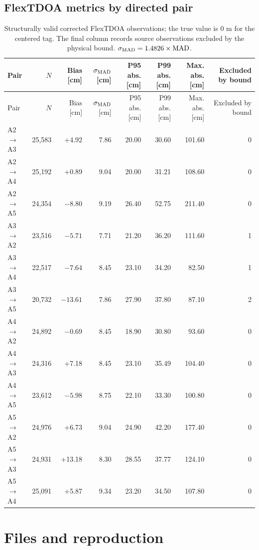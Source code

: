 \documentclass[11pt,a4paper]{article}
\begin{document}
\begin{landscape}
\section{FlexTDOA metrics by directed pair}

\scriptsize
\begin{longtable}{lrrrrrrr}
  \caption{Structurally valid corrected FlexTDOA observations; the true value
  is 0 m for the centered tag. The final column records source observations
  excluded by the physical bound.
  $\sigma_{\rm MAD}=1.4826\times{\rm MAD}$.}\\
  \toprule
  Pair & $N$ & Bias [cm] & $\sigma_{\rm MAD}$ [cm] & P95 abs. [cm] &
  P99 abs. [cm] & Max. abs. [cm] & Excluded by bound\\
  \midrule
  \endfirsthead
  \toprule
  Pair & $N$ & Bias [cm] & $\sigma_{\rm MAD}$ [cm] & P95 abs. [cm] &
  P99 abs. [cm] & Max. abs. [cm] & Excluded by bound\\
  \midrule
  \endhead
  A2$\to$A3 & 25,583 & +4.92 & 7.86 & 20.00 & 30.60 & 101.60 & 0\\
  A2$\to$A4 & 25,192 & +0.89 & 9.04 & 20.00 & 31.21 & 108.60 & 0\\
  A2$\to$A5 & 24,354 & $-8.80$ & 9.19 & 26.40 & 52.75 & 211.40 & 0\\
  A3$\to$A2 & 23,516 & $-5.71$ & 7.71 & 21.20 & 36.20 & 111.60 & 1\\
  A3$\to$A4 & 22,517 & $-7.64$ & 8.45 & 23.10 & 34.20 & 82.50 & 1\\
  A3$\to$A5 & 20,732 & $-13.61$ & 7.86 & 27.90 & 37.80 & 87.10 & 2\\
  A4$\to$A2 & 24,892 & $-0.69$ & 8.45 & 18.90 & 30.80 & 93.60 & 0\\
  A4$\to$A3 & 24,316 & +7.18 & 8.45 & 23.10 & 35.49 & 104.40 & 0\\
  A4$\to$A5 & 23,612 & $-5.98$ & 8.75 & 22.10 & 33.30 & 100.80 & 0\\
  A5$\to$A2 & 24,976 & +6.73 & 9.04 & 24.90 & 42.20 & 177.40 & 0\\
  A5$\to$A3 & 24,931 & +13.18 & 8.30 & 28.55 & 37.77 & 124.10 & 0\\
  A5$\to$A4 & 25,091 & +5.87 & 9.34 & 23.20 & 34.50 & 107.80 & 0\\
  \bottomrule
\end{longtable}
\end{landscape}

\section{Files and reproduction}
\end{document}
